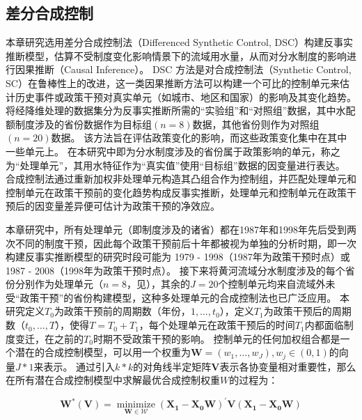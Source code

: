 \subsection{差分合成控制}\label{sec:DSC}

本章研究选用差分合成控制法（Differenced Synthetic Control, DSC）构建反事实推断模型，估算不受制度变化影响情景下的流域用水量，从而对分水制度的影响进行因果推断（Causal Inference）。
DSC 方法是对合成控制法（Synthetic Control, SC）在鲁棒性上的改进\cite{billmeier2013, smith2015}，这一类因果推断方法可以构建一个可比的控制单元来估计历史事件或政策干预对真实单元（如城市、地区和国家）的影响及其变化趋势\cite{abadie2010, abadie2015, hill2021}。
将经降维处理的数据集分为反事实推断所需的“实验组”和“对照组”数据，其中水配额制度涉及的省份数据作为目标组$(n=8)$数据，其他省份则作为对照组$(n=20)$数据。
该方法旨在评估政策变化的影响，而这些政策变化集中在其中一些单元上。
在本研究中即为分水制度涉及的省份属于政策影响的单元，称之为“处理单元”，其用水特征作为“真实值”使用“目标组”数据的因变量进行表达。
合成控制法通过重新加权非处理单元构造其凸组合作为控制组，并匹配处理单元和控制单元在政策干预前的变化趋势构成反事实推断，处理单元和控制单元在政策干预后的因变量差异便可估计为政策干预的净效应。

本章研究中，所有处理单元（即制度涉及的诸省）都在1987年和1998年先后受到两次不同的制度干预，因此每个政策干预前后十年都被视为单独的分析时期，即一次构建反事实推断模型的研究时段可能为 1979 - 1998（1987年为政策干预时点）或 1987 - 2008（1998年为政策干预时点）。
接下来将黄河流域分水制度涉及的每个省份分别作为处理单元（$n=8$，见），其余的$J=20$个控制单元均来自流域外未受“政策干预”的省份构建模型，这种多处理单元的合成控制法也已广泛应用\cite{abadie2021}。
本研究定义$T_0$为政策干预前的周期数（年份，$1,\ldots,t_0$），定义$T_1$为政策干预后的周期数（$t_0,\ldots,T$），使得$T = T_0+ T_1$，每个处理单元在政策干预后的时间$T_1$内都面临制度变迁，在之前的$T_0$时期不受政策干预的影响。
控制单元的任何加权组合都是一个潜在的合成控制模型，可以用一个权重为$\mathbf{W} = (w_{1},\ldots,w_{J}), w_j \in (0, 1)$的向量$J * 1$来表示。
通过引入$k * k$的对角线半定矩阵$\mathbf{V}$表示各协变量相对重要性，那么在所有潜在合成控制模型中求解最优合成控制权重$W$的过程为：

\begin{equation}
    \mathbf{W^{*}(V)}=\underset{\mathbf{W} \in \mathcal{W}}{\operatorname{minimize}}{\left(\mathbf{X}_{\mathbf{1}}-\mathbf{X}_{\mathbf{0}} \mathbf{W}\right)}^{\prime} {\mathbf{V}}{\left(\mathbf{X}_{\mathbf{1}}-\mathbf{X}_{\mathbf{0}} \mathbf{W}\right)}
\end{equation}

